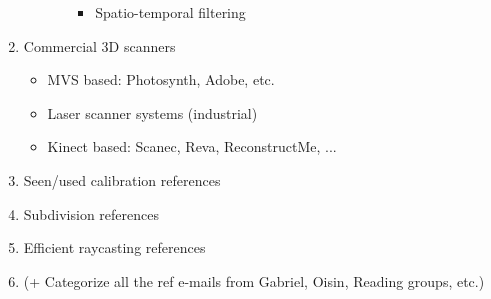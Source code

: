 \documentclass[12pt,a4paper]{article}
\begin{document}
\begin{enumerate}
\begin{itemize}
\begin{itemize}
\begin{itemize}
					\item Spatio-temporal filtering
					
				\end{itemize}
			\end{itemize}
		\end{itemize}
		
		\item Commercial 3D scanners
		\begin{itemize}
			\item MVS based: Photosynth, Adobe, etc.
			\item Laser scanner systems (industrial)
			\item Kinect based: Scanec, Reva, ReconstructMe, ...
		\end{itemize}
		
		\item Seen/used calibration references
		\item Subdivision references
		\item Efficient raycasting references
		\item (+ Categorize all the ref e-mails from Gabriel, Oisin, Reading groups, etc.)
	
	\end{enumerate}


\end{document}
